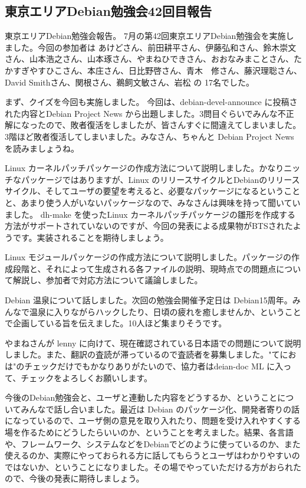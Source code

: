 \documentclass[mingoth,a4paper]{jsarticle}
\begin{document}
\subsection{東京エリアDebian勉強会42回目報告}

東京エリアDebian勉強会報告。 7月の第42回東京エリアDebian勉強会を実施しました。今回の参加者は あけどさん、前田耕平さん、伊藤弘和さん、鈴木崇文さん、山本浩之さん、山本琢さん、やまねひできさん、おおなみまことさん、たかすぎやすひこさん、本庄さん、日比野啓さん、青木　修さん、藤沢理聡さん、David Smithさん、関根さん、鵜飼文敏さん、岩松 の 17名でした。

まず、クイズを今回も実施しました。 今回は、debian-devel-announce に投稿された内容とDebian Project News から出題しました。3問目ぐらいでみんな不正解になったので、敗者復活をしましたが、皆さんすぐに間違えてしまいました。3階ほど敗者復活してしまいました。みなさん、ちゃんと Debian Project News を読みましょうね。

Linux カーネルパッチパッケージの作成方法について説明しました。かなりニッチなパッケージではありますが、Linux のリリースサイクルとDebianのリリースサイクル、そしてユーザの要望を考えると、必要なパッケージになるということと、あまり使う人がいないパッケージなので、みなさんは興味を持って聞いていました。 dh-make を使ったLinux カーネルパッチパッケージの雛形を作成する方法がサポートされていないのですが、今回の発表による成果物がBTSされたようです。実装されることを期待しましょう。

Linux モジュールパッケージの作成方法について説明しました。パッケージの作成段階と、それによって生成される各ファイルの説明、現時点での問題点について解説し、参加者で対応方法について議論しました。

Debian 温泉について話しました。次回の勉強会開催予定日は Debian15周年。みんなで温泉に入りながらハックしたり、日頃の疲れを癒しませんか、ということで企画している旨を伝えました。10人ほど集まりそうです。

やまねさんが lenny に向けて、現在確認されている日本語での問題について説明しました。また、翻訳の査読が滞っているので査読者を募集しました。"てにおは"のチェックだけでもかなりありがたいので、協力者はdeian-doc ML に入って、チェックをよろしくお願いします。

今後のDebian勉強会と、ユーザと連動した内容をどうするか、ということについてみんなで話し合いました。最近は Debian のパッケージ化、開発者寄りの話になっているので、ユーザ側の意見を取り入れたり、問題を受け入れやすくする場を作るためにどうしたらいいのか、ということを考えました。結果、各言語や、フレームワーク、システムなどをDebianでどのように使っているのか、また使えるのか、実際にやっておられる方に話してもらうとユーザはわかりやすいのではないか、ということになりました。その場でやっていただける方がおられたので、今後の発表に期待しましょう。
\end{document}
